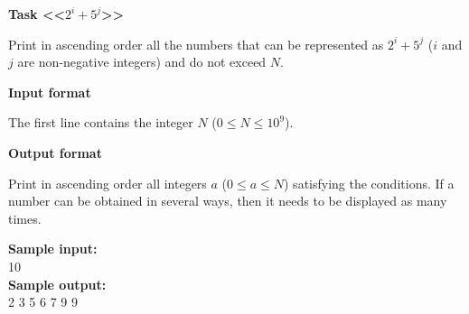 \documentclass[a4paper]{article}
\begin{document}
\textbf{Task <<$2^i + 5^j$>>}

\SPACE

Print in ascending order all the numbers that can be represented as $2^i + 5^j$ ($i$ and $j$ are non-negative integers) and do not exceed $N$.

\SPACE

\textbf{Input format}

The first line contains the integer $N$ ($0 \le N \le 10^9$).

\SPACE

\textbf{Output format}

Print in ascending order all integers $a$ ($0 \le a \le N$) satisfying the conditions. If a number can be obtained in several ways, then it needs to be displayed as many times.

\LINE

\noindent \textbf{Sample input:}\\
10\\


\noindent \textbf{Sample output:}\\
2 3 5 6 7 9 9\\
\end{document}

